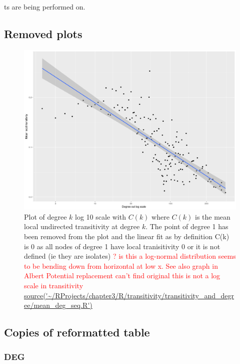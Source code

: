 ts are being performed on. 
\subsection{Removed plots}
\begin{figure}
    \centering
    \includegraphics[width=\textwidth]{images/Rplot_k(c)_remove0.png}
    \caption{Plot of degree $k$ log 10 scale with $C(k)$ where $C(k)$ is the mean local undirected transitivity at degree $k$. The point of degree 1 has been removed from the plot and the linear fit as by definition C(k) is 0 as all nodes of degree 1 have local tranisitivity 0 or it is not defined (ie they are isolates) \textcolor{red}{? is this a log-normal distribution seems to be bending down from horizontal at low x. See also graph in Albert Potential replacement can't find original this is not a log scale in transitivity  \url{source('~/RProjects/chapter3/R/transitivity/transitivity_and_degree/mean_deg_seq.R')}}}
    \label{fig:C(k)_remove0}
\end{figure}

\subsection{Copies of reformatted table}
\subsubsection{DEG}

